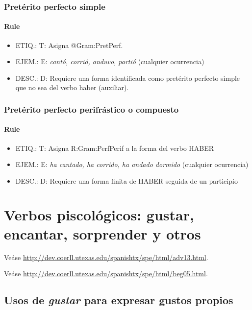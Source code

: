 \documentclass[11pt]{report}
\begin{document}
\subsubsection{Pretérito perfecto simple}
\paragraph*{Rule}
\begin{itemize}
\item ETIQ.:  T: Asigna @Gram:PretPerf.
\item EJEM.:  E: \emph{cantó, corrió, anduvo, partió} (cualquier ocurrencia)
\item DESC.:  D: Requiere una forma identificada como pretérito perfecto simple que no sea del verbo haber (auxiliar).
\end{itemize}

\subsubsection{Pretérito perfecto perifrástico o compuesto}
\paragraph*{Rule}
\begin{itemize}
\item ETIQ.:  T: Asigna R:Gram:PerfPerif a la forma del verbo HABER
\item EJEM.:  E: \emph{ha cantado, ha corrido, ha andado dormido} (cualquier ocurrencia)
\item DESC.:  D: Requiere una forma finita de HABER seguida de un participio
\end{itemize}

\section{Verbos piscológicos: gustar, encantar, sorprender y otros}
Veáse \url{http://dev.coerll.utexas.edu/spanishtx/spe/html/adv13.html}.

Veáse \url{http://dev.coerll.utexas.edu/spanishtx/spe/html/beg05.html}.

\subsection{Usos de \emph{gustar} para expresar gustos propios}
\end{document}
